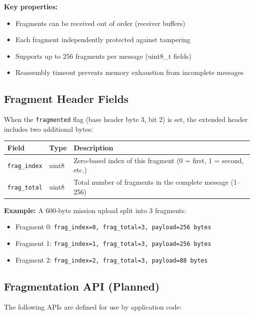 \documentclass[11pt,a4paper]{article}
\begin{document}
\textbf{Key properties:}
\begin{itemize}[noitemsep]
    \item Fragments can be received out of order (receiver buffers)
    \item Each fragment independently protected against tampering
    \item Supports up to 256 fragments per message (uint8\_t fields)
    \item Reassembly timeout prevents memory exhaustion from incomplete messages
\end{itemize}

\subsection{Fragment Header Fields}

When the \texttt{fragmented} flag (base header byte 3, bit 2) is set, the extended header includes two additional bytes:

\begin{table}[H]
\centering
\begin{tabular}{@{}llp{8cm}@{}}
\toprule
\textbf{Field} & \textbf{Type} & \textbf{Description} \\
\midrule
\texttt{frag\_index} & uint8 & Zero-based index of this fragment (0 = first, 1 = second, etc.) \\
\texttt{frag\_total} & uint8 & Total number of fragments in the complete message (1--256) \\
\bottomrule
\end{tabular}
\end{table}

\textbf{Example:} A 600-byte mission upload split into 3 fragments:
\begin{itemize}[noitemsep]
    \item Fragment 0: \texttt{frag\_index=0, frag\_total=3, payload=256 bytes}
    \item Fragment 1: \texttt{frag\_index=1, frag\_total=3, payload=256 bytes}
    \item Fragment 2: \texttt{frag\_index=2, frag\_total=3, payload=88 bytes}
\end{itemize}

\subsection{Fragmentation API (Planned)}

The following APIs are defined for use by application code:
\end{document}
